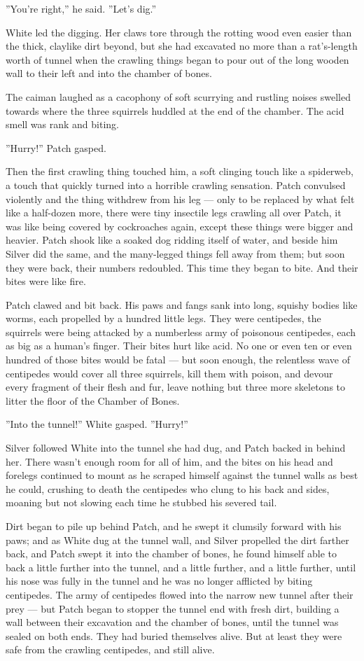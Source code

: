 \documentclass[12pt]{book}
\begin{document}
''You're right,'' he said. ''Let's dig.''

White led the digging. Her claws tore through the rotting wood even
easier than the thick, claylike dirt beyond, but she had excavated no
more than a rat's-length worth of tunnel when the crawling things
began to pour out of the long wooden wall to their left and into the
chamber of bones.

The caiman laughed as a cacophony of soft scurrying and rustling
noises swelled towards where the three squirrels huddled at the end of
the chamber. The acid smell was rank and biting.

''Hurry!'' Patch gasped.

Then the first crawling thing touched him, a soft clinging touch like
a spiderweb, a touch that quickly turned into a horrible crawling
sensation. Patch convulsed violently and the thing withdrew from his
leg --- only to be replaced by what felt like a half-dozen more, there
were tiny insectile legs crawling all over Patch, it was like being
covered by cockroaches again, except these things were bigger and
heavier. Patch shook like a soaked dog ridding itself of water, and
beside him Silver did the same, and the many-legged things fell away
from them; but soon they were back, their numbers redoubled. This time
they began to bite. And their bites were like fire.

Patch clawed and bit back. His paws and fangs sank into long, squishy
bodies like worms, each propelled by a hundred little legs. They were
centipedes, the squirrels were being attacked by a numberless army of
poisonous centipedes, each as big as a human's finger. Their bites
hurt like acid. No one or even ten or even hundred of those bites
would be fatal --- but soon enough, the relentless wave of centipedes
would cover all three squirrels, kill them with poison, and devour
every fragment of their flesh and fur, leave nothing but three more
skeletons to litter the floor of the Chamber of Bones.

''Into the tunnel!'' White gasped. ''Hurry!''

Silver followed White into the tunnel she had dug, and Patch backed in
behind her. There wasn't enough room for all of him, and the bites on
his head and forelegs continued to mount as he scraped himself against
the tunnel walls as best he could, crushing to death the centipedes
who clung to his back and sides, moaning but not slowing each time he
stubbed his severed tail.

Dirt began to pile up behind Patch, and he swept it clumsily forward
with his paws; and as White dug at the tunnel wall, and Silver
propelled the dirt farther back, and Patch swept it into the chamber
of bones, he found himself able to back a little further into the
tunnel, and a little further, and a little further, until his nose was
fully in the tunnel and he was no longer afflicted by biting
centipedes. The army of centipedes flowed into the narrow new tunnel
after their prey --- but Patch began to stopper the tunnel end with
fresh dirt, building a wall between their excavation and the chamber
of bones, until the tunnel was sealed on both ends. They had buried
themselves alive. But at least they were safe from the crawling
centipedes, and still alive.
\end{document}
